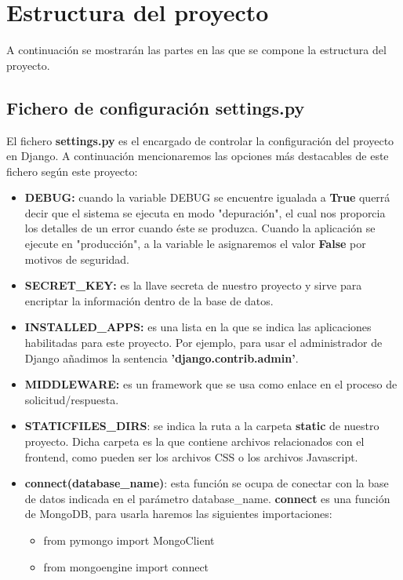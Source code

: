 \section{Estructura del proyecto}
A continuación se mostrarán las partes en las que se compone la estructura del proyecto. \\

\subsection{Fichero de configuración settings.py}
El fichero \textbf{settings.py} es el encargado de controlar la configuración del proyecto en Django. A continuación mencionaremos las opciones más destacables de este fichero según este proyecto:

\begin{itemize}
	\item \textbf{DEBUG:} cuando la variable DEBUG se encuentre igualada a \textbf{True} querrá decir que el sistema se ejecuta en modo "depuración", el cual nos proporcia los detalles de un error cuando éste se produzca. Cuando la aplicación se ejecute en "producción", a la variable le asignaremos el valor \textbf{False} por motivos de seguridad.
	
	\item \textbf{SECRET\_KEY:} es la llave secreta de nuestro proyecto y sirve para encriptar la información dentro de la base de datos.
	
	\item \textbf{INSTALLED\_APPS:} es una lista en la que se indica las aplicaciones habilitadas para este proyecto. Por ejemplo, para usar el administrador de Django añadimos la sentencia \textbf{'django.contrib.admin'}.
	
	\item \textbf{MIDDLEWARE:} es un framework que se usa como enlace en el proceso de solicitud/respuesta.
	
	\item \textbf{STATICFILES\_DIRS}: se indica la ruta a la carpeta \textbf{static} de nuestro proyecto. Dicha carpeta es la que contiene archivos relacionados con el frontend, como pueden ser los archivos CSS o los archivos Javascript.
	
	\item \textbf{connect(database\_name)}: esta función se ocupa de conectar con la base de datos indicada en el parámetro database\_name. \textbf{connect} es una función de MongoDB, para usarla haremos las siguientes importaciones:
	\begin{itemize}
		\item from pymongo import MongoClient
		\item from mongoengine import connect				
	\end{itemize}
	

\end{itemize}

